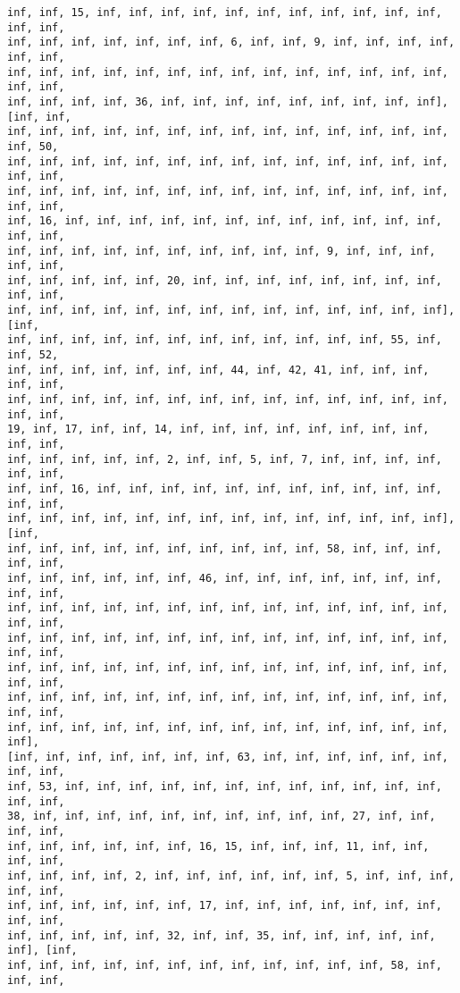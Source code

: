 \documentclass[11pt]{article}
\begin{document}
\begin{Verbatim}[commandchars=\\\{\}]
inf, inf, 15, inf, inf, inf, inf, inf, inf, inf, inf, inf, inf, inf, inf, inf,
inf, inf, inf, inf, inf, inf, inf, 6, inf, inf, 9, inf, inf, inf, inf, inf, inf,
inf, inf, inf, inf, inf, inf, inf, inf, inf, inf, inf, inf, inf, inf, inf, inf,
inf, inf, inf, inf, 36, inf, inf, inf, inf, inf, inf, inf, inf, inf], [inf, inf,
inf, inf, inf, inf, inf, inf, inf, inf, inf, inf, inf, inf, inf, inf, inf, 50,
inf, inf, inf, inf, inf, inf, inf, inf, inf, inf, inf, inf, inf, inf, inf, inf,
inf, inf, inf, inf, inf, inf, inf, inf, inf, inf, inf, inf, inf, inf, inf, inf,
inf, 16, inf, inf, inf, inf, inf, inf, inf, inf, inf, inf, inf, inf, inf, inf,
inf, inf, inf, inf, inf, inf, inf, inf, inf, inf, 9, inf, inf, inf, inf, inf,
inf, inf, inf, inf, inf, 20, inf, inf, inf, inf, inf, inf, inf, inf, inf, inf,
inf, inf, inf, inf, inf, inf, inf, inf, inf, inf, inf, inf, inf, inf], [inf,
inf, inf, inf, inf, inf, inf, inf, inf, inf, inf, inf, inf, 55, inf, inf, 52,
inf, inf, inf, inf, inf, inf, inf, 44, inf, 42, 41, inf, inf, inf, inf, inf,
inf, inf, inf, inf, inf, inf, inf, inf, inf, inf, inf, inf, inf, inf, inf, inf,
19, inf, 17, inf, inf, 14, inf, inf, inf, inf, inf, inf, inf, inf, inf, inf,
inf, inf, inf, inf, inf, 2, inf, inf, 5, inf, 7, inf, inf, inf, inf, inf, inf,
inf, inf, 16, inf, inf, inf, inf, inf, inf, inf, inf, inf, inf, inf, inf, inf,
inf, inf, inf, inf, inf, inf, inf, inf, inf, inf, inf, inf, inf, inf], [inf,
inf, inf, inf, inf, inf, inf, inf, inf, inf, inf, 58, inf, inf, inf, inf, inf,
inf, inf, inf, inf, inf, inf, 46, inf, inf, inf, inf, inf, inf, inf, inf, inf,
inf, inf, inf, inf, inf, inf, inf, inf, inf, inf, inf, inf, inf, inf, inf, inf,
inf, inf, inf, inf, inf, inf, inf, inf, inf, inf, inf, inf, inf, inf, inf, inf,
inf, inf, inf, inf, inf, inf, inf, inf, inf, inf, inf, inf, inf, inf, inf, inf,
inf, inf, inf, inf, inf, inf, inf, inf, inf, inf, inf, inf, inf, inf, inf, inf,
inf, inf, inf, inf, inf, inf, inf, inf, inf, inf, inf, inf, inf, inf, inf],
[inf, inf, inf, inf, inf, inf, inf, 63, inf, inf, inf, inf, inf, inf, inf, inf,
inf, 53, inf, inf, inf, inf, inf, inf, inf, inf, inf, inf, inf, inf, inf, inf,
38, inf, inf, inf, inf, inf, inf, inf, inf, inf, inf, 27, inf, inf, inf, inf,
inf, inf, inf, inf, inf, inf, 16, 15, inf, inf, inf, 11, inf, inf, inf, inf,
inf, inf, inf, inf, 2, inf, inf, inf, inf, inf, inf, 5, inf, inf, inf, inf, inf,
inf, inf, inf, inf, inf, inf, 17, inf, inf, inf, inf, inf, inf, inf, inf, inf,
inf, inf, inf, inf, inf, 32, inf, inf, 35, inf, inf, inf, inf, inf, inf], [inf,
inf, inf, inf, inf, inf, inf, inf, inf, inf, inf, inf, inf, 58, inf, inf, inf,

\end{Verbatim}
\end{document}

